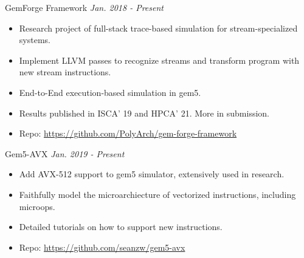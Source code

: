 \documentclass[a4paper]{article}
\newenvironment{changemargin}[2]{%
  \begin{list}{}{%
    \setlength{\topsep}{0pt}%
    \setlength{\leftmargin}{#1}%
    \setlength{\rightmargin}{#2}%
    \setlength{\listparindent}{\parindent}%
    \setlength{\itemindent}{\parindent}%
    \setlength{\parsep}{\parskip}%
  }%
  \item[]}{\end{list}
}
\newenvironment{body} {
	\vspace*{-16pt}
	\begin{changemargin}{-0.25in}{-0.5in}
  }	
	{\end{changemargin}
}
\begin{document}
\begin{body}
	\vspace{14pt}

	GemForge Framework \hfill \emph{Jan. 2018 - Present}
	\begin{itemize}
	\itemsep 0pt
	\item Research project of full-stack trace-based simulation for stream-specialized systems.
	\item Implement LLVM passes to recognize streams and transform program with new stream instructions.
	\item End-to-End execution-based simulation in gem5.
	\item Results published in ISCA' 19 and HPCA' 21. More in submission.
	\item Repo: \href{https://github.com/PolyArch/gem-forge-framework}{https://github.com/PolyArch/gem-forge-framework}
	\end{itemize}
	\smallskip

	Gem5-AVX \hfill \emph{Jan. 2019 - Present}
	\begin{itemize}
	\itemsep 0pt
	\item Add AVX-512 support to gem5 simulator, extensively used in research.
	\item Faithfully model the microarchiecture of vectorized instructions, including microops.
	\item Detailed tutorials on how to support new instructions.
	\item Repo: \href{https://github.com/seanzw/gem5-avx}{https://github.com/seanzw/gem5-avx}
	\end{itemize}
	\smallskip




\end{body}
\end{document}
